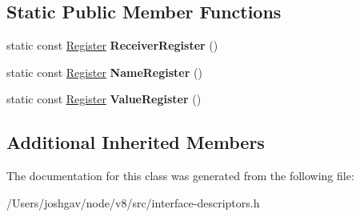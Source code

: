 \subsection*{Static Public Member Functions}
\begin{DoxyCompactItemize}
\item 
static const \hyperlink{structv8_1_1internal_1_1_register}{Register} {\bfseries Receiver\+Register} ()\hypertarget{classv8_1_1internal_1_1_store_descriptor_a23e290bced0fc22413eb3a5746afbeb3}{}\label{classv8_1_1internal_1_1_store_descriptor_a23e290bced0fc22413eb3a5746afbeb3}

\item 
static const \hyperlink{structv8_1_1internal_1_1_register}{Register} {\bfseries Name\+Register} ()\hypertarget{classv8_1_1internal_1_1_store_descriptor_a3e8a31908fff1b70729f59fb53b8a557}{}\label{classv8_1_1internal_1_1_store_descriptor_a3e8a31908fff1b70729f59fb53b8a557}

\item 
static const \hyperlink{structv8_1_1internal_1_1_register}{Register} {\bfseries Value\+Register} ()\hypertarget{classv8_1_1internal_1_1_store_descriptor_a7b3fa0b29709a54c5fc88a0e051c5076}{}\label{classv8_1_1internal_1_1_store_descriptor_a7b3fa0b29709a54c5fc88a0e051c5076}

\end{DoxyCompactItemize}
\subsection*{Additional Inherited Members}


The documentation for this class was generated from the following file\+:\begin{DoxyCompactItemize}
\item 
/\+Users/joshgav/node/v8/src/interface-\/descriptors.\+h\end{DoxyCompactItemize}
